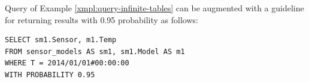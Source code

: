 \vspace*{0.5cm}
\begin{example}
Query of Example \ref{xmpl:query-infinite-tables} can be augmented with a guideline for returning results with 0.95 probability as follows:

\begin{verbatim}
SELECT sm1.Sensor, m1.Temp
FROM sensor_models AS sm1, sm1.Model AS m1
WHERE T = 2014/01/01#00:00:00
WITH PROBABILITY 0.95
\end{verbatim}
\end{example}
\vspace*{0.5cm}




